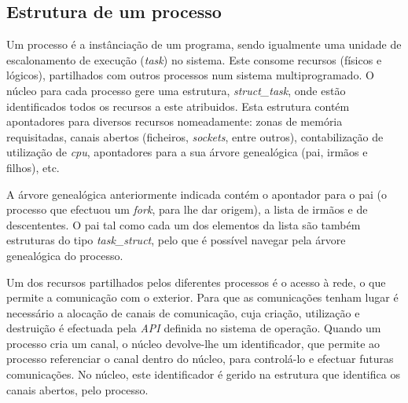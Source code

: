 



\subsection{Estrutura de um processo}

Um processo é a instânciação de um programa, sendo igualmente uma unidade de escalonamento de execução (\textit{task}) no sistema.
Este consome recursos (físicos e lógicos), partilhados com outros processos num sistema multiprogramado.
O núcleo para cada processo gere uma estrutura, \textit{struct\_task}, onde estão identificados todos os recursos a este atribuidos.
Esta estrutura contém apontadores para diversos recursos nomeadamente: zonas de memória requisitadas, canais abertos (ficheiros, \textit{sockets}, entre outros), contabilização de utilização de \textit{cpu}, apontadores para a sua árvore genealógica (pai, irmãos e filhos), etc.

A árvore genealógica anteriormente indicada contém o apontador para o pai (o processo que efectuou um \textit{fork}, para lhe dar origem), a lista de irmãos e de descententes.
O pai tal como cada um dos elementos da lista são também estruturas do tipo \textit{task\_struct}, pelo que é possível navegar pela árvore genealógica do processo.

Um dos recursos partilhados pelos diferentes processos é o acesso à rede, o que permite a comunicação com o exterior.
Para que as comunicações tenham lugar é necessário a alocação de canais de comunicação, cuja criação, utilização e destruição é efectuada pela \textit{API} definida no sistema de operação.
Quando um processo cria um canal, o núcleo devolve-lhe um identificador, que permite ao processo referenciar o canal dentro do núcleo, para controlá-lo e efectuar futuras comunicações.
No núcleo, este identificador é gerido na estrutura que identifica os canais abertos, pelo processo.

